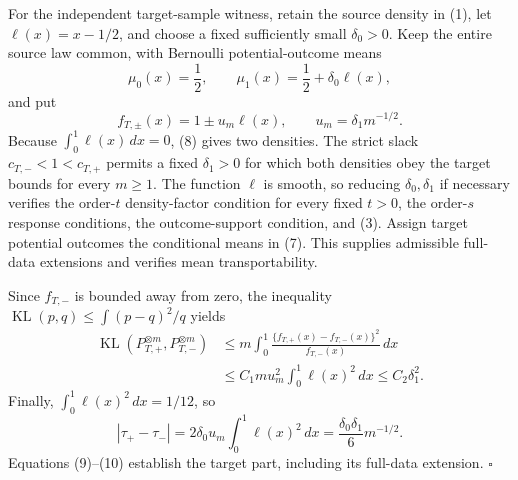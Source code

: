 For the independent target-sample witness, retain the source density in (1), let \(\ell(x)=x-1/2\), and choose a fixed sufficiently small \(\delta_0>0\). Keep the entire source law common, with Bernoulli potential-outcome means
\[
\mu_0(x)=\frac12,
\qquad
\mu_1(x)=\frac12+\delta_0\ell(x),
\tag{7}
\]
and put
\[
f_{T,\pm}(x)=1\pm u_m\ell(x),
\qquad
u_m=\delta_1m^{-1/2}.
\tag{8}
\]
Because \(\int_0^1\ell(x)\,dx=0\), (8) gives two densities. The strict slack \(c_{T,-}<1<c_{T,+}\) permits a fixed \(\delta_1>0\) for which both densities obey the target bounds for every \(m\ge1\). The function \(\ell\) is smooth, so reducing \(\delta_0,\delta_1\) if necessary verifies the order-\(t\) density-factor condition for every fixed \(t>0\), the order-\(s\) response conditions, the outcome-support condition, and (3). Assign target potential outcomes the conditional means in (7). This supplies admissible full-data extensions and verifies mean transportability.

Since \(f_{T,-}\) is bounded away from zero, the inequality \(\operatorname{KL}(p,q)\le\int(p-q)^2/q\) yields
\[
\begin{aligned}
\operatorname{KL}(P_{T,+}^{\otimes m},P_{T,-}^{\otimes m})
&\le m\int_0^1
 \frac{\{f_{T,+}(x)-f_{T,-}(x)\}^2}{f_{T,-}(x)}\,dx\\
&\le C_1mu_m^2\int_0^1\ell(x)^2\,dx
\le C_2\delta_1^2.
\end{aligned}
\tag{9}
\]
Finally, \(\int_0^1\ell(x)^2\,dx=1/12\), so
\[
|\tau_+-\tau_-|
=2\delta_0u_m\int_0^1\ell(x)^2\,dx
=\frac{\delta_0\delta_1}{6}m^{-1/2}.
\tag{10}
\]
Equations (9)--(10) establish the target part, including its full-data extension. \(\square\)